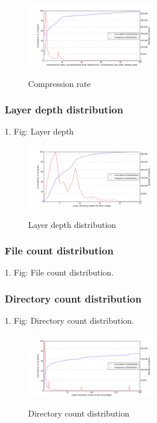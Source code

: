 \begin{figure}
	\centering
	\includegraphics[width=0.5\textwidth]{graphs/distributionCompression_ratio_Uncompressed_layer_tarball_size_divided_by_compressed_size_with_method_gzip.png}\\
	\caption{Compression rate}\label{fig_image_size_compression}
\end{figure}

\subsubsection{Layer depth distribution}

1. Fig: Layer depth

\begin{figure}
	\centering
	\includegraphics[width=0.5\textwidth]{graphs/distributionLayer_directory_depth_for_each_image.png}\\
	\caption{Layer depth distribution}\label{fig_image_size_compression}
\end{figure}


\subsubsection{File count distribution}

1. Fig: File count distribution.

\subsubsection{Directory count distribution}

1. Fig: Directory count distribution.

\begin{figure}
	\centering
	\includegraphics[width=0.5\textwidth]{graphs/distributionLayer_directory_count_across_all_images.png}\\
	\caption{Directory count distribution}\label{fig_image_size_compression}
\end{figure}

